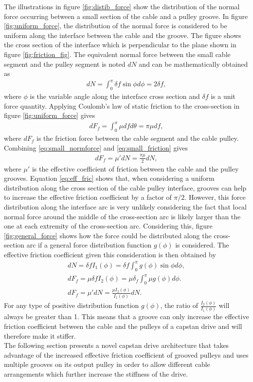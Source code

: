  The illustrations in figure \ref{fig:distib_force} show the distribution of the normal force occurring between a small section of the cable and a pulley groove. In figure \ref{fig:uniform_force}, the distribution of the normal force is considered to be uniform along the interface between the cable and the groove. The figure shows the cross section of the interface which is perpendicular to the plane shown in figure \ref{fig:friction_fig}. The equivalent normal force between the small cable segment and the pulley segment is noted $dN$ and can be mathematically obtained as 
 \begin{align}
     dN = \int_0^\pi \delta f\sin{\phi}d\phi = 2\delta f,
     \label{eq:small_normforce}
 \end{align}
 where $\phi$ is the variable angle along the interface cross section and $\delta f$ is a unit force quantity. Applying Coulomb's law of static friction to the cross-section in figure \ref{fig:uniform_force} gives 
 \begin{align}
     dF_f = \int_0^\pi\mu df d\theta=\pi\mu df, \label{eq:small_friction}
 \end{align}
 where $dF_f$ is the friction force between the cable segment and the cable pulley. Combining  \eqref{eq:small_normforce} and \eqref{eq:small_friction} gives
 \begin{align}
     dF_f=\mu'dN=\frac{\pi\mu}{2}dN,\label{eq:eff_fric}
 \end{align}
 where $\mu'$ is the effective coefficient of friction between the cable and the pulley grooves. Equation \eqref{eq:eff_fric} shows that, when considering a uniform distribution along the cross section of the cable pulley interface, grooves can help to increase the effective friction coefficient by a factor of $\pi/2$. However, this force distribution along the interface arc is very unlikely considering the fact that local normal force around the middle of the cross-section arc is likely larger than the one at each extremity of the cross-section arc. Considering this, figure \ref{fig:general_force} shows how the force could be distributed along the cross-section arc if a general force distribution function $g(\phi)$ is considered. The effective friction coefficient given this consideration is then obtained by
 \begin{align}
     dN = \delta f I_1(\phi) = \delta f\int_0^{\pi}g(\phi)\sin\phi d\phi,\\
     dF_f = \mu\delta f I_2(\phi) = \mu\delta_f\int_0^\pi\mu g(\phi)d\phi.\\
     dF_f =\mu'dN= \frac{\mu I_2(\phi)}{I_1(\phi)}dN.
 \end{align}
 For any type of positive distribution function $g(\phi)$, the ratio of $\frac{I_2(\phi)}{I_1(\phi)}$ will always be greater than 1. This means that a groove can only increase the effective friction coefficient between the cable and the pulleys of a capstan drive and will therefore make it stiffer. 
\\ 
 The following section presents a novel capstan drive architecture that takes advantage of the increased effective friction coefficient of grooved pulleys and uses multiple grooves on its output pulley in order to allow different cable arrangements which further increase the stiffness of the drive.
